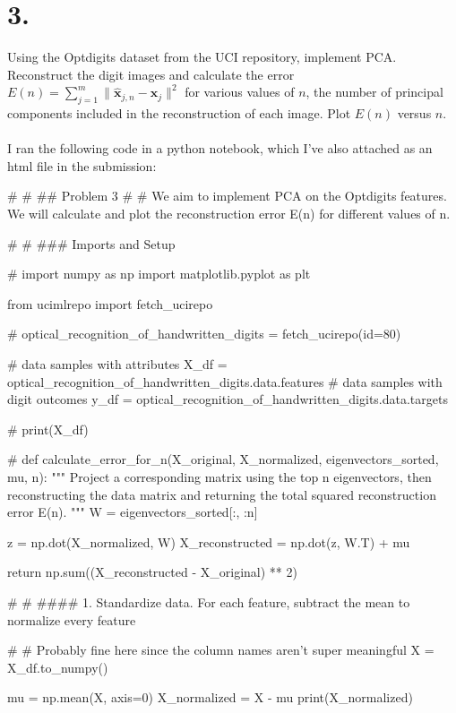 \documentclass{article}
\begin{document}
{\Large 

\section*{3.}
Using the Optdigits dataset from the UCI repository, implement PCA. Reconstruct the digit images and calculate the error \(E(n) = \sum_{j=1}^{m} \lVert \hat{\mathbf{x}}_{j,n} - \mathbf{x}_j \rVert^2 \) for various values of \(n\), the number of principal components included in the reconstruction of each image. Plot \(E(n)\) versus \(n\). \\ \\
I ran the following code in a python notebook, which I've also attached as an html file in the submission:
\begin{spverbatim}
# %
# ## Problem 3
# 
# We aim to implement PCA on the Optdigits features. We will calculate and plot the reconstruction error E(n) for different values of n.

# %
# ### Imports and Setup

# %
import numpy as np
import matplotlib.pyplot as plt

from ucimlrepo import fetch_ucirepo 

# %
optical_recognition_of_handwritten_digits = fetch_ucirepo(id=80) 

# data samples with attributes
X_df = optical_recognition_of_handwritten_digits.data.features 
# data samples with digit outcomes
y_df = optical_recognition_of_handwritten_digits.data.targets 

# %
print(X_df)

# %
def calculate_error_for_n(X_original, X_normalized, eigenvectors_sorted, mu, n):
    """
    Project a corresponding matrix using the top n eigenvectors, 
    then reconstructing the data matrix and returning the total squared reconstruction error E(n).
    """
    W = eigenvectors_sorted[:, :n]
    
    z = np.dot(X_normalized, W)
    X_reconstructed = np.dot(z, W.T) + mu
    
    return np.sum((X_reconstructed - X_original) ** 2)

# %
# #### 1. Standardize data. For each feature, subtract the mean to normalize every feature

# %
# Probably fine here since the column names aren't super meaningful
X = X_df.to_numpy()

mu = np.mean(X, axis=0)
X_normalized = X - mu
print(X_normalized)


\end{spverbatim}}
\end{document}
